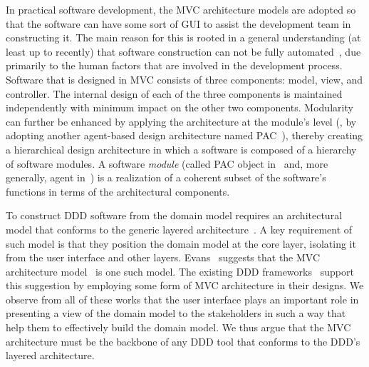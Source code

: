 In practical software development, the MVC architecture models are adopted so that the software can have some sort of GUI to assist the development team in constructing it. The main reason for this is rooted in a general understanding (at least up to recently) that software construction can not be fully automated~\cite{fuggetta_software_2014}, due primarily to the human factors that are involved in the development process. %
Software that is designed in MVC consists of three components: model, view, and controller. The internal design of each of the three components is maintained independently with minimum impact on the other two components. Modularity can further be enhanced by applying the architecture at the module's level (\eg, by adopting another agent-based design architecture named PAC~\cite{coutaz_pac:_1987}), thereby creating a hierarchical design architecture in which a software is composed of a hierarchy of software modules. A software \textit{module} (called PAC object in~\cite{coutaz_pac:_1987} and, more generally, agent in~\cite{calvary_single-user_1997}) is a realization of a coherent subset of the software's functions in terms of the architectural components.

To construct DDD software from the domain model requires an architectural model that conforms to the generic layered architecture~\cite{evans_domain-driven_2004, vernon_implementing_2013}. A key requirement of such model is that they position the domain model at the core layer, isolating it from the user interface and other layers. Evans~\cite{evans_domain-driven_2004} suggests that the MVC architecture model~\cite{krasner_description_1988} is one such model. The existing DDD frameworks~\cite{dan_haywood_apache_2013,paniza_learn_2011} support this suggestion by employing some form of MVC architecture in their designs. We observe from all of these works that the user interface plays an important role in presenting a view of the domain model to the stakeholders in such a way that help them to effectively build the domain model. We thus argue that the MVC architecture must be the backbone of any DDD tool that conforms to the DDD's layered architecture. 

